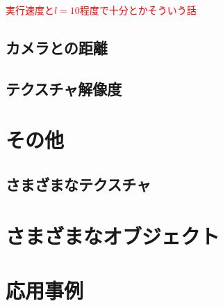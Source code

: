 \textcolor{red}{実行速度と$l = 10$程度で十分とかそういう話}

\newpage
\subsection{カメラとの距離}
\label{SSCameraDist}

\subsection{テクスチャ解像度}
\label{SSTexReso}



\section{その他}
\label{S}

\subsection{さまざまなテクスチャ}
\label{SS}

\section{さまざまなオブジェクト}
\label{S}

\section{応用事例}
\label{S}









